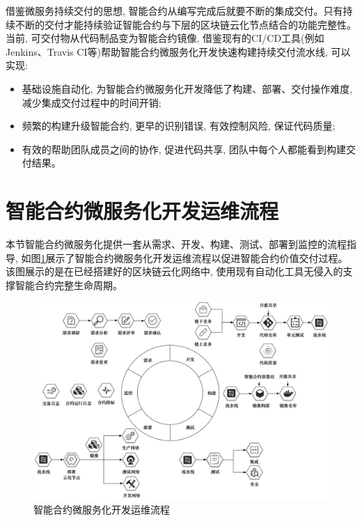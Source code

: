 借鉴微服务持续交付的思想, 智能合约从编写完成后就要不断的集成交付。只有持续不断的交付才能持续验证智能合约与下层的区块链云化节点结合的功能完整性。当前, 可交付物从代码制品变为智能合约镜像, 借鉴现有的CI/CD工具(例如Jenkins、Travis CI等)帮助智能合约微服务化开发快速构建持续交付流水线, 可以实现:

\begin{itemize}[itemindent=2em]
    \item 基础设施自动化, 为智能合约微服务化开发降低了构建、部署、交付操作难度,减少集成交付过程中的时间开销;

    \item 频繁的构建升级智能合约, 更早的识别错误, 有效控制风险, 保证代码质量;

    \item 有效的帮助团队成员之间的协作, 促进代码共享, 团队中每个人都能看到构建交付结果。
\end{itemize}


\section{智能合约微服务化开发运维流程}\label{section: smart_contract_micro}

本节智能合约微服务化提供一套从需求、开发、构建、测试、部署到监控的流程指导, 如图\ref{sc_develop}展示了智能合约微服务化开发运维流程以促进智能合约价值交付过程。该图展示的是在已经搭建好的区块链云化网络中, 使用现有自动化工具无侵入的支撑智能合约完整生命周期。

\begin{figure}[h] %
    \centering %
    \includegraphics[width=1.0\textwidth]{FIGs/chapter4/process.png} %
    \caption{智能合约微服务化开发运维流程} %
    \label{sc_develop} %
\end{figure}%


